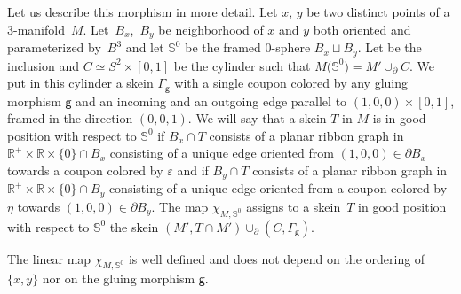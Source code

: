 \documentclass[pdftex]{sigma}
\numberwithin{equation}{section}
\newcommand{\gm}{{\mathsf{g}}}
\numberwithin{theorem}{section}
\numberwithin{proposition}{section}
\numberwithin{definition}{section}
\numberwithin{lemma}{section}
\numberwithin{corollary}{section}
\numberwithin{remark}{section}
\numberwithin{example}{section}
\newcommand{\R}{\ensuremath{\mathbb{R}}}
\newcommand{\ve}{\varepsilon}
\newcommand{\Sp}{\mathbb{S}}
\begin{document}
Let us describe this morphism in more detail.
Let $x$, $y$ be two distinct points of a 3\nobreakdash-mani\-fold~$M$. Let~$B_x$,~$B_y$
be neighborhood of $x$ and $y$ both oriented and parameterized by~$B^3$
and let ${\Sp^0}$ be the framed 0-sphere $B_x\sqcup B_y$. Let
 be the
inclusion and $C\simeq S^2\times [0,1]$ be the cylinder such that
$M\bigl({\Sp^0}\bigr)=M'\cup_\partial C$. We put in this cylinder a skein $\Gamma_\gm$ with a single coupon
colored by any gluing morphism $\gm$ and an incoming and an outgoing edge
parallel to $(1,0,0)\times [0,1]$, framed in the direction $(0,0,1)$. We will say that a skein $T$ in $M$ is in good position with respect to $\Sp^0$ if $B_x\cap T$ consists of a
planar ribbon graph in $\R^+\times\R\times\{0\}\cap B_x$ consisting of
a unique edge oriented from $(1,0,0)\in\partial B_x$ towards a coupon
colored by $\ve$ and if $B_y\cap T$ consists of a planar ribbon graph
in $\R^+\times\R\times\{0\}\cap B_y$ consisting of a unique edge
oriented from a coupon colored by $\eta$ towards
$(1,0,0)\in\partial B_y$. The map $\chi_{M,{\Sp^0}}$ assigns to a
skein~$T$ in good position
with respect to
 $\Sp^0$ the skein
$(M',
T\cap M')\cup_\partial (C,\Gamma_\gm)$.
\begin{proposition}\label{prop:1handlewelldef}
 The linear map $\chi_{M,\Sp^0}$ is well defined and does not depend
 on the ordering of~$\{x,y\}$ nor
 on the gluing morphism $\gm$.
\end{proposition}
\end{document}
